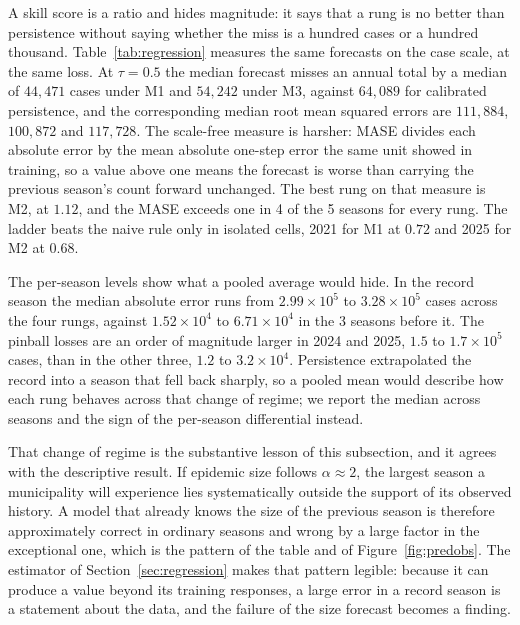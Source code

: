 \documentclass[english,10pt,b5paper]{article}
\begin{document}


A skill score is a ratio and hides magnitude: it says that a rung is no better
than persistence without saying whether the miss is a hundred cases or a
hundred thousand. Table~\ref{tab:regression} measures the same forecasts on
the case scale, at the same loss. At $\tau=0.5$ the median forecast misses an
annual total by a median of $44{,}471$ cases under M1 and $54{,}242$ under M3,
against $64{,}089$ for calibrated persistence, and the corresponding median
root mean squared errors are $111{,}884$, $100{,}872$ and $117{,}728$. The
scale-free measure is harsher: MASE divides each absolute error by the mean
absolute one-step error the same unit showed in training, so a value above one
means the forecast is worse than carrying the previous season's count forward
unchanged. The best rung on that measure is M2, at $1.12$, and the MASE
exceeds one in 4 of the 5 seasons for every rung. The ladder beats the naive
rule only in isolated cells, 2021 for M1 at $0.72$ and 2025 for M2 at $0.68$.

The per-season levels show what a pooled average would hide. In the record
season the median absolute error runs from $2.99\times10^{5}$ to
$3.28\times10^{5}$ cases across the four rungs, against $1.52\times10^{4}$ to
$6.71\times10^{4}$ in the 3 seasons before it. The pinball losses are an order
of magnitude larger in 2024 and 2025, $1.5$ to $1.7\times10^{5}$ cases, than
in the other three, $1.2$ to $3.2\times10^{4}$. Persistence extrapolated the
record into a season that fell back sharply, so a pooled mean would describe
how each rung behaves across that change of regime; we report the median
across seasons and the sign of the per-season differential instead.

That change of regime is the substantive lesson of this subsection, and it agrees
with the descriptive result. If epidemic size follows $\alpha \approx 2$, the
largest season a municipality will experience lies systematically outside the
support of its observed history. A model that already knows the size of the
previous season is therefore approximately correct in ordinary seasons and wrong by
a large factor in the exceptional one, which is the pattern of the table and of
Figure~\ref{fig:predobs}. The estimator of Section~\ref{sec:regression} makes that
pattern legible: because it can produce a value beyond its training responses, a
large error in a record season is a statement about the data, and the failure of
the size forecast becomes a finding.
\end{document}
